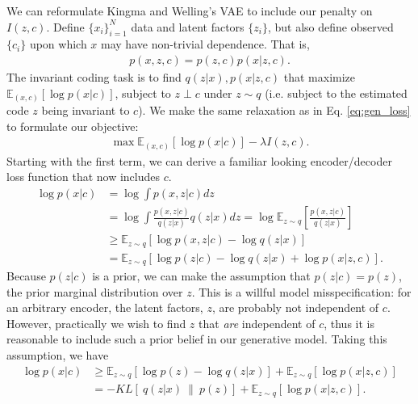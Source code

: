 We can reformulate Kingma and Welling's VAE to include our penalty on $I(z,c)$.
Define $\{x_i\}_{i=1}^N$ data and latent factors $\{z_i\}$, but also define observed $\{c_i\}$ upon which $x$ may have non-trivial dependence. That is,
\begin{align}
p(x,z,c) = p(z,c)p(x|z,c).
\end{align}
The invariant coding task is to find $q(z|x),p(x|z,c)$ that maximize $\mathbb{E}_{(x,c)}[\log p(x|c)]$, subject to $z \perp c $ under $z\sim q$ (i.e. subject to the estimated code $z$ being invariant to $c$). We make the same relaxation as in Eq. \ref{eq:gen_loss} to formulate our objective:
\begin{align}
\max \mathbb{E}_{(x,c)}[\log p(x|c)] - \lambda I(z,c).
\end{align}
Starting with the first term, we can derive a familiar looking encoder/decoder loss function that now includes $c$.
\begin{align}
\log p(x|c) & = \log \int p(x,z|c) dz\\
& = \log \int \frac{p(x,z|c)}{q(z|x)} q(z|x) dz = \log \mathbb{E}_{z\sim q}\left[ \frac{p(x,z|c)}{q(z|x)} \right]\\
& \geq \mathbb{E}_{z\sim q}[ \log p(x,z|c) - \log q(z|x) ]\\
& = \mathbb{E}_{z\sim q}[\log p(z|c) - \log q(z|x) +  \log p(x|z,c) ] .
\end{align}
Because $p(z|c)$ is a prior, we can make the assumption that $p(z|c) = p(z)$, the prior marginal distribution over $z$. This is a willful model misspecification: for an arbitrary encoder, the latent factors, $z$, are probably not independent of $c$. However, practically we wish to find $z$ that \emph{are} independent of $c$, thus it is reasonable to include such a prior belief in our generative model.
Taking this assumption, we have
\begin{align}
\log p(x|c) & \geq \mathbb{E}_{z\sim q}[\log p(z) - \log q(z|x)] + \mathbb{E}_{z\sim q}[\log p(x|z,c)]\\
& = -KL[~q(z|x)~\|~p(z)] + \mathbb{E}_{z\sim q}[\log p(x|z,c)]. \label{eq:first_term}
\end{align}
